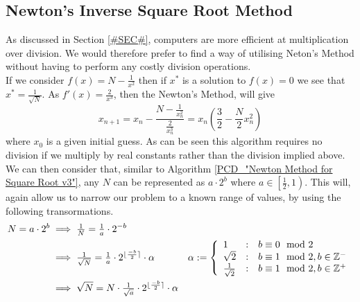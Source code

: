 \subsection{Newton's Inverse Square Root Method}
\label{SUB_"Newton's Inverse Square Root Method"}

\theoremstyle{plain}
\newtheorem{Inv Sqrt Quad Conv}{Proposition}[subsection]

As discussed in Section \ref{#SEC#}, computers are more efficient at multiplication over division. We would therefore prefer to find a way of utilising Neton's Method without having to perform any costly division operations.\\

If we consider \(f(x) = N - \frac{1}{x^2}\) then if \(x^\ast\) is a solution to \(f(x) = 0\) we see that \(x^\ast = \frac{1}{\sqrt{N}}\). As \(f'(x) = \frac{2}{x^3}\), then the Newton's Method, will give \[x_{n+1} = x_n - \frac{N - \frac{1}{x_n^2}}{\frac{2}{x_n^3}} = x_n\left(\frac{3}{2} - \frac{N}{2}x_n^2\right)\] where \(x_0\) is a given initial guess. As can be seen this algorithm requires no division if we multiply by real constants rather than the division implied above.\\

We can then consider that, similar to Algorithm \ref{PCD_"Newton Method for Square Root v3"}, any \(N\) can be represented as \(a \cdot 2^b\) where \(a \in \left[\tfrac{1}{2}, 1\right)\). This will, again allow us to narrow our problem to a known range of values, by using the following transormations.
\begin{displaymath}
\begin{align*}
N = a \cdot 2^b &\implies \tfrac{1}{N} = \tfrac{1}{a} \cdot 2^{-b}\\
	&\implies \tfrac{1}{\sqrt{N}} = \tfrac{1}{a}\cdot2^{\lfloor\frac{-b}{2}\rceil} \cdot \alpha
		&\alpha := \left\{
			\begin{array}{lcl}
				1 & : & b \equiv 0 \mod 2\\
				\sqrt{2} & : & b \equiv 1 \mod 2, b \in \mathbb{Z}^-\\
				\frac{1}{\sqrt{2}} & : & b \equiv 1 \mod 2, b \in \mathbb{Z}^+\\
			\end{array}\right.\\
	& \implies \sqrt{N} = N \cdot \tfrac{1}{\sqrt{a}} \cdot 2^{\lfloor\frac{-b}{2}\rceil} \cdot \alpha
\end{align*}
\end{displaymath}

